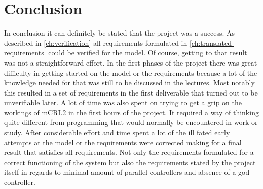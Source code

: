 \documentclass[final]{report}
\begin{document}
\chapter{Conclusion}
In conclusion it can definitely be stated that the project was a success. 
As described in \cref{ch:verification} all requirements formulated in \cref{ch:translated-requirements} could be verified for the model. 
Of course, getting to that result was not a straightforward effort. 
In the first phases of the project there was great difficulty in getting started on the model or the requirements because a lot of the knowledge needed for that was still to be discussed in the lectures. 
Most notably this resulted in a set of requirements in the first deliverable that turned out to be unverifiable later. A lot of time was also spent on trying to get a grip on the workings of mCRL2 in the first hours of the project. 
It required a way of thinking quite different from programming that would normally be encountered in work or study. 
After considerable effort and time spent a lot of the ill fated early attempts at the model or the requirements were corrected making for a final result that satisfies all requirements. 
Not only the requirements formulated for a correct functioning of the system but also the requirements stated by the project itself in regards to minimal amount of parallel controllers and absence of a god controller.
\end{document}

